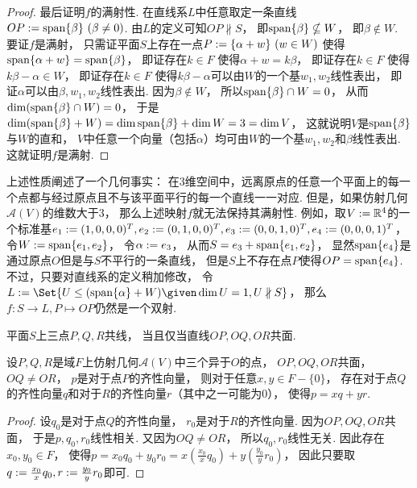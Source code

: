 \begin{property}
\begin{proof}
最后证明\(f\)的满射性.
在直线系\(L\)中任意取定一条直线\(OP := \operatorname{span}\{\beta\}\ (\beta\neq0)\).
由\(L\)的定义可知\(OP \nparallel S\)，
即\(\operatorname{span}\{\beta\} \nsubseteq W\)，
即\(\beta \notin W\).
要证\(f\)是满射，
只需证平面\(S\)上存在一点\(P := \{\alpha + w\}\ (w \in W)\)
使得\(\operatorname{span}\{\alpha + w\} = \operatorname{span}\{\beta\}\)，
即证存在\(k \in F\)
使得\(\alpha + w = k \beta\)，
即证存在\(k \in F\)
使得\(k \beta - \alpha \in W\)，
即证存在\(k \in F\)
使得\(k \beta - \alpha\)可以由\(W\)的一个基\(w_1,w_2\)线性表出，
即证\(\alpha\)可以由\(\beta,w_1,w_2\)线性表出.
因为\(\beta \notin W\)，
所以\(\operatorname{span}\{\beta\} \cap W = 0\)，
从而\(
	\dim(\operatorname{span}\{\beta\} \cap W) = 0
\)，
于是\(
	\dim(\operatorname{span}\{\beta\} + W)
	= \dim\operatorname{span}\{\beta\}
	+ \dim W
	= 3
	= \dim V
\)，
这就说明\(V\)是\(\operatorname{span}\{\beta\}\)与\(W\)的直和，
\(V\)中任意一个向量（包括\(\alpha\)）均可由\(W\)的一个基\(w_1,w_2\)和\(\beta\)线性表出.
这就证明\(f\)是满射.
\end{proof}
\end{property}
\begin{remark}
上述性质阐述了一个几何事实：
在3维空间中，远离原点的任意一个平面上的每一个点都与经过原点且不与该平面平行的每一个直线一一对应.
但是，如果仿射几何\(\mathcal{A}(V)\)的维数大于\(3\)，
那么上述映射\(f\)就无法保持其满射性.
例如，取\(V := \mathbb{R}^4\)的一个标准基\(
	e_1 := (1,0,0,0)^T,
	e_2 := (0,1,0,0)^T,
	e_3 := (0,0,1,0)^T,
	e_4 := (0,0,0,1)^T
\)，
令\(W := \operatorname{span}\{e_1,e_2\}\)，
令\(\alpha := e_3\)，
从而\(S = e_3 + \operatorname{span}\{e_1,e_2\}\)，
显然\(\operatorname{span}\{e_4\}\)是通过原点\(O\)但是与\(S\)不平行的一条直线，
但是\(S\)上不存在点\(P\)使得\(OP = \operatorname{span}\{e_4\}\).
不过，只要对直线系的定义稍加修改，
令\(  %
	L
	\defeq
	\Set{
		U \AlgebraSubstructure (\Span\{\alpha\} + W)
		\given
		\dim U = 1,
		U \nparallel S
	}
\)，
那么\(f\colon S \to L, P \mapsto OP\)仍然是一个双射.
\end{remark}

\begin{property}
平面\(S\)上三点\(P,Q,R\)共线，
当且仅当直线\(OP,OQ,OR\)共面.
\end{property}

\begin{lemma}
设\(P,Q,R\)是域\(F\)上仿射几何\(\mathcal{A}(V)\)中三个异于\(O\)的点，
\(OP,OQ,OR\)共面，
\(OQ \neq OR\)，
\(p\)是对于点\(P\)的齐性向量，
则对于任意\(x,y \in F - \{0\}\)，
存在对于点\(Q\)的齐性向量\(q\)和对于\(R\)的齐性向量\(r\)（其中之一可能为\(0\)），
使得\(p = x q + y r\).
\begin{proof}
设\(q_0\)是对于点\(Q\)的齐性向量，
\(r_0\)是对于\(R\)的齐性向量.
因为\(OP,OQ,OR\)共面，
于是\(p,q_0,r_0\)线性相关.
又因为\(OQ \neq OR\)，
所以\(q_0,r_0\)线性无关.
因此存在\(x_0,y_0 \in F\)，
使得\(
	p = x_0 q_0 + y_0 r_0
	= x \left( \frac{x_0}{x} q_0 \right)
	+ y \left( \frac{y_0}{y} r_0 \right)
\)，
因此只要取\(
	q := \frac{x_0}{x} q_0,
	r := \frac{y_0}{y} r_0
\)即可.
\end{proof}
\end{lemma}
